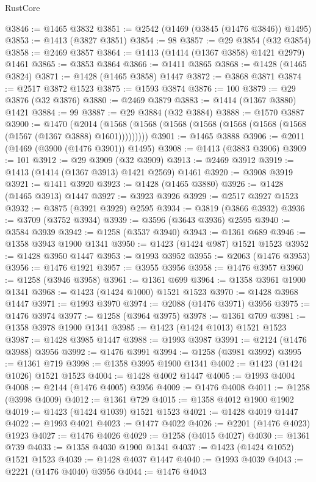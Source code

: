 \begin{lexlean}{RustCore}
\begin{coremodule}
@3846 := @1465 @3832
@3851 := @2542 (@1469 (@3845 (@1476 @3846)) @1495)
@3853 := @1413 (@3827 @3851)
@3854 := 98
@3857 := @29 @3854 (@32 @3854)
@3858 := @2469 @3857
@3864 := @1413 (@1414 (@1367 @3858) @1421 @2979) @1461
@3865 := @3853 @3864
@3866 := @1411 @3865
@3868 := @1428 (@1465 @3824)
@3871 := @1428 (@1465 @3858) @1447
@3872 := @3868 @3871
@3874 := @2517 @3872 @1523
@3875 := @1593 @3874
@3876 := 100
@3879 := @29 @3876 (@32 @3876)
@3880 := @2469 @3879
@3883 := @1414 (@1367 @3880) @1421
@3884 := 99
@3887 := @29 @3884 (@32 @3884)
@3888 := @1570 @3887
@3900 := @1470
    (@2014 (@1568 (@1568 (@1568 (@1568 (@1568 (@1568 (@1568 (@1567 (@1367 @3888) @1601)))))))))
@3901 := @1465 @3888
@3906 := @2011 (@1469 (@3900 (@1476 @3901)) @1495)
@3908 := @1413 (@3883 @3906)
@3909 := 101
@3912 := @29 @3909 (@32 @3909)
@3913 := @2469 @3912
@3919 := @1413 (@1414 (@1367 @3913) @1421 @2569) @1461
@3920 := @3908 @3919
@3921 := @1411 @3920
@3923 := @1428 (@1465 @3880)
@3926 := @1428 (@1465 @3913) @1447
@3927 := @3923 @3926
@3929 := @2517 @3927 @1523
@3932 := @3875 (@3921 @3929) @2595
@3934 := @3819 (@3866 @3932)
@3936 := @3709 (@3752 @3934)
@3939 := @3596 (@3643 @3936) @2595
@3940 := @3584 @3939
@3942 := @1258 (@3537 @3940)
@3943 := @1361 @689
@3946 := @1358 @3943 @1900 @1341
@3950 := @1423 (@1424 @987) @1521 @1523
@3952 := @1428 @3950 @1447
@3953 := @1993 @3952
@3955 := @2063 (@1476 @3953)
@3956 := @1476 @1921
@3957 := @3955 @3956
@3958 := @1476 @3957
@3960 := @1258 (@3946 @3958)
@3961 := @1361 @699
@3964 := @1358 @3961 @1900 @1341
@3968 := @1423 (@1424 @1000) @1521 @1523
@3970 := @1428 @3968 @1447
@3971 := @1993 @3970
@3974 := @2088 (@1476 @3971) @3956
@3975 := @1476 @3974
@3977 := @1258 (@3964 @3975)
@3978 := @1361 @709
@3981 := @1358 @3978 @1900 @1341
@3985 := @1423 (@1424 @1013) @1521 @1523
@3987 := @1428 @3985 @1447
@3988 := @1993 @3987
@3991 := @2124 (@1476 @3988) @3956
@3992 := @1476 @3991
@3994 := @1258 (@3981 @3992)
@3995 := @1361 @719
@3998 := @1358 @3995 @1900 @1341
@4002 := @1423 (@1424 @1026) @1521 @1523
@4004 := @1428 @4002 @1447
@4005 := @1993 @4004
@4008 := @2144 (@1476 @4005) @3956
@4009 := @1476 @4008
@4011 := @1258 (@3998 @4009)
@4012 := @1361 @729
@4015 := @1358 @4012 @1900 @1902
@4019 := @1423 (@1424 @1039) @1521 @1523
@4021 := @1428 @4019 @1447
@4022 := @1993 @4021
@4023 := @1477 @4022
@4026 := @2201 (@1476 @4023) @1923
@4027 := @1476 @4026
@4029 := @1258 (@4015 @4027)
@4030 := @1361 @739
@4033 := @1358 @4030 @1900 @1341
@4037 := @1423 (@1424 @1052) @1521 @1523
@4039 := @1428 @4037 @1447
@4040 := @1993 @4039
@4043 := @2221 (@1476 @4040) @3956
@4044 := @1476 @4043

\end{coremodule}
\end{lexlean}
